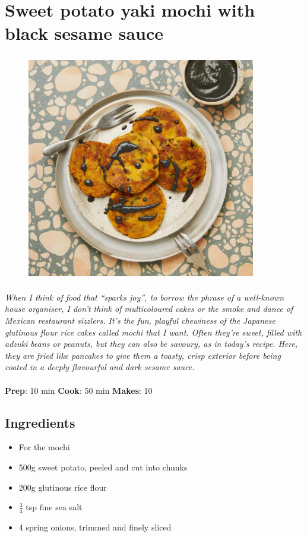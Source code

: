 \documentclass{book}
\begin{document}
\section{Sweet potato yaki mochi with black sesame sauce}
\begin{figure}
\centering\includegraphics[width=10cm,height=10cm,keepaspectratio]{Recipe_Pictures/Sweet_potato_yaki_mochi_with_black_sesame_sauce.png}
\end{figure}
\emph{When I think of food that “sparks joy”, to borrow the phrase of a well-known house organiser, I don’t think of multicoloured cakes or the smoke and dance of Mexican restaurant sizzlers. It’s the fun, playful chewiness of the Japanese glutinous flour rice cakes called mochi that I want. Often they’re sweet, filled with adzuki beans or peanuts, but they can also be savoury, as in today’s recipe. Here, they are fried like pancakes to give them a toasty, crisp exterior before being coated in a deeply flavourful and dark sesame sauce.}\\\\ 
\textbf{Prep}: 10 min
\textbf{Cook}: 50 min
\textbf{Makes}: 10
\subsection*{Ingredients}
\begin{itemize}
\item For the mochi
\item 500g sweet potato, peeled and cut into chunks
\item 200g glutinous rice flour
\item $\frac{3}{4}$ tsp fine sea salt 
\item 4 spring onions, trimmed and finely sliced
\end{itemize}
\end{document}
